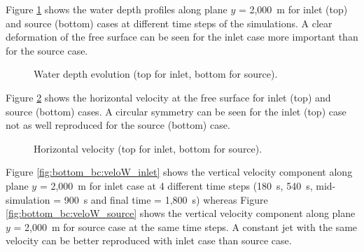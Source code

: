 
Figure \ref{fig:bottom_bc:waterdepth} shows the water depth profiles along
plane $y$ = 2,000~m for inlet (top) and source (bottom) cases
at different time steps of the simulations.
A clear deformation of the free surface can be seen for the inlet case
more important than for the source case.

\begin{figure}[H]
\centering
\begin{minipage}[t]{1.1\textwidth}
 \centering
{}
\end{minipage}
%
\begin{minipage}[t]{\textwidth}
 \centering
{}
\end{minipage}
%
 \caption{Water depth evolution (top for inlet, bottom for source).}
 \label{fig:bottom_bc:waterdepth}
\end{figure}

Figure \ref{fig:bottom_bc:veloH} shows the horizontal velocity
at the free surface for inlet (top) and source (bottom) cases.
A circular symmetry can be seen for the inlet (top) case not
as well reproduced for the source (bottom) case.

\begin{figure}[H]
\centering
\begin{minipage}[t]{.9\textwidth}
 \centering
{}
\end{minipage}
%
\begin{minipage}[t]{.9\textwidth}
 \centering
{}
\end{minipage}
%
 \caption{Horizontal velocity (top for inlet, bottom for source).}
 \label{fig:bottom_bc:veloH}
\end{figure}

Figure \ref{fig:bottom_bc:veloW_inlet} shows the vertical velocity component
along plane $y$ = 2,000~m for inlet case at 4 different time steps
(180~s, 540~s, mid-simulation = 900~s and final time = 1,800~s) whereas
Figure \ref{fig:bottom_bc:veloW_source} shows the vertical velocity component
along plane $y$ = 2,000~m for source case at the same time steps.
A constant jet with the same velocity can be better reproduced with inlet
case than source case.

